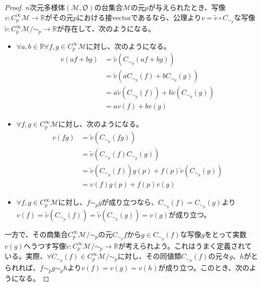 \documentclass[dvipdfmx]{jsarticle}
\begin{document}
\begin{proof}
  $n$次元多様体$\left(\mathcal{M},\mathfrak{O}\right)$の台集合$\mathcal{M}$の元$p$が与えられたとき、写像$v:C^\infty_p \mathcal{M}\rightarrow \mathbb{R}$がその元$p$における接vectorであるなら、公理より$v=\widetilde{v}\circ C_{\sim_p}$な写像$\widetilde{v}:C^\infty_p \mathcal{M}/\sim_p \rightarrow \mathbb{R}$が存在して、次のようになる。
  \begin{itemize}
    \item $\forall a,b\in \mathbb{R} \forall f,g\in C^\infty_p \mathcal{M}$に対し、次のようになる。
    \begin{align*}
      v\left( af+bg\right) &=\widetilde{v} \left( C_{\sim_p}\left( af+bg\right) \right) \\
      &=\widetilde{v} \left( aC_{\sim_p}\left(f\right)+bC_{\sim_p}\left(g\right) \right) \\
      &=a\widetilde{v} \left( C_{\sim_p}\left(f\right) \right) +b\widetilde{v} \left( C_{\sim_p}\left(g\right) \right) \\
      &=av\left(f\right) +bv\left(g\right) 
    \end{align*}
    \item $\forall f,g\in C^\infty_p \mathcal{M}$に対し、次のようになる。
    \begin{align*}
      v\left(fg\right)&=\widetilde{v}\left(C_{\sim_p} \left(fg\right)\right)\\
      &=\widetilde{v}\left( C_{\sim_p}\left(f\right)C_{\sim_p}\left(g\right)\right) \\
      &=\widetilde{v}\left(C_{\sim_p}\left(f\right)\right) g\left( p\right) +f\left( p\right) \widetilde{v}\left(C_{\sim_p}\left(g\right)\right) \\
      &=v\left(f\right)g\left( p\right)+f\left(p\right)v\left(g\right) 
    \end{align*}
    \item $\forall f,g \in C^\infty_p \mathcal{M}$に対し、$f\sim_p g$が成り立つなら、$C_{\sim_p }\left(f\right)=C_{\sim_p } \left(g\right)$より$v\left(f\right) =\widetilde{v}\left(C_{\sim_p }\left(f\right)\right)=\widetilde{v}\left(C_{\sim_p }\left(g\right)\right)=v\left(g\right)$が成り立つ。
  \end{itemize}\par
  一方で、その商集合$C^\infty_p \mathcal{M}/\sim_p$の元$C_{\sim_p} f$から$g\in C_{\sim_p}\left(f\right)$な写像$g$をとって実数$v\left(g\right)$へうつす写像$\widetilde{v}:C^\infty_p \mathcal{M}/\sim_p \rightarrow \mathbb{R}$が考えられよう。これはうまく定義されている。実際、$\forall C_{\sim_p} \left(f\right)\in C^\infty_p \mathcal{M}/\sim_p$に対し、その同値類$C_{\sim_p} \left(f\right)$の元々$g$、$h$がとられれば、$f\sim_p g\sim_p h$より$v\left(f\right)=v\left(g\right)=v\left(h\right)$が成り立つ。このとき、次のようになる。

\end{proof}
\end{document}
